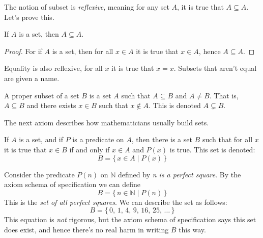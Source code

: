             The notion of subset is \textit{reflexive}, meaning for any set
            $A$, it is true that $A\subseteq{A}$. Let's prove this.
            \begin{theorem}
                If $A$ is a set, then $A\subseteq{A}$.
            \end{theorem}
            \begin{proof}
                For if $A$ is a set, then for all $x\in{A}$ it is true that
                $x\in{A}$, hence $A\subseteq{A}$.
            \end{proof}
            Equality is also reflexive, for all $x$ it is true that $x=x$.
            Subsets that aren't equal are given a name.
            \begin{definition}
                A proper subset of a set $B$ is a set $A$ such that
                $A\subseteq{B}$ and $A\ne{B}$. That is, $A\subseteq{B}$ and
                there exists $x\in{B}$ such that $x\notin{A}$. This is denoted
                $A\subsetneq{B}$.
            \end{definition}
            The next axiom describes how mathematicians usually build sets.
            \begin{axiom}
                If $A$ is a set, and if $P$ is a predicate on $A$, then there
                is a set $B$ such that for all $x$ it is true that $x\in{B}$ if
                and only if $x\in{A}$ and $P(x)$ is true. This set is denoted:
                \begin{equation}
                    B=\{\,x\in{A}\;|\;P(x)\,\}
                \end{equation}
            \end{axiom}
            \begin{example}
                Consider the predicate $P(n)$ on $\mathbb{N}$ defined by
                \textit{n is a perfect square}. By the axiom schema of
                specification we can define
                \begin{equation}
                    B=\{\,n\in\mathbb{N}\;|\;P(n)\,\}
                \end{equation}
                This is the \textit{set of all perfect squares}. We can describe
                the set as follows:
                \begin{equation}
                    B=\{\,0,\,1,\,4,\,9,\,16,\,25,\,\dots\,\}
                \end{equation}
                This equation is \textit{not} rigorous, but the axiom schema of
                specification says this set does exist, and hence there's no
                real harm in writing $B$ this way.
            \end{example}
